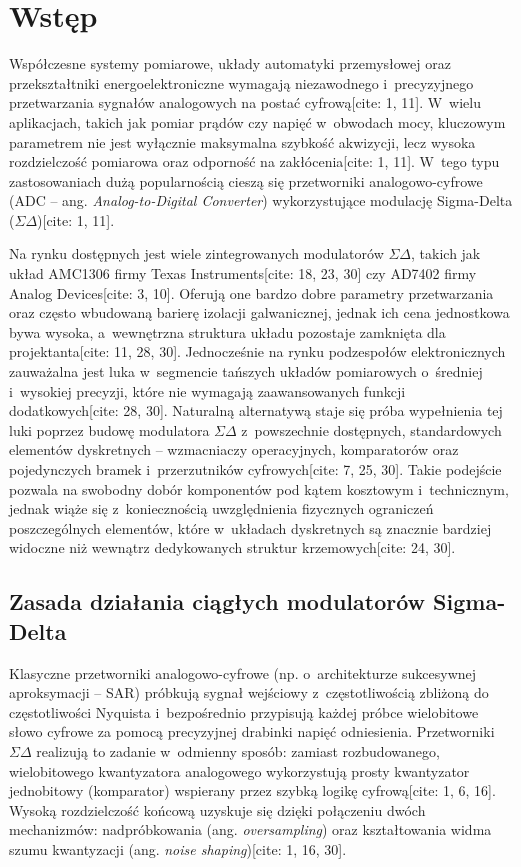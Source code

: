 \chapter{Wstęp}
\label{ch:wstep}

Współczesne systemy pomiarowe, układy automatyki przemysłowej oraz przekształtniki energoelektroniczne wymagają niezawodnego i~precyzyjnego przetwarzania sygnałów analogowych na postać cyfrową[cite: 1, 11]. W~wielu aplikacjach, takich jak pomiar prądów czy napięć w~obwodach mocy, kluczowym parametrem nie jest wyłącznie maksymalna szybkość akwizycji, lecz wysoka rozdzielczość pomiarowa oraz odporność na zakłócenia[cite: 1, 11]. W~tego typu zastosowaniach dużą popularnością cieszą się przetworniki analogowo-cyfrowe (ADC -- ang. \textit{Analog-to-Digital Converter}) wykorzystujące modulację Sigma-Delta ($\Sigma\Delta$)[cite: 1, 11].

Na rynku dostępnych jest wiele zintegrowanych modulatorów $\Sigma\Delta$, takich jak układ AMC1306 firmy Texas Instruments[cite: 18, 23, 30] czy AD7402 firmy Analog Devices[cite: 3, 10]. Oferują one bardzo dobre parametry przetwarzania oraz często wbudowaną barierę izolacji galwanicznej, jednak ich cena jednostkowa bywa wysoka, a~wewnętrzna struktura układu pozostaje zamknięta dla projektanta[cite: 11, 28, 30]. Jednocześnie na rynku podzespołów elektronicznych zauważalna jest luka w~segmencie tańszych układów pomiarowych o~średniej i~wysokiej precyzji, które nie wymagają zaawansowanych funkcji dodatkowych[cite: 28, 30]. Naturalną alternatywą staje się próba wypełnienia tej luki poprzez budowę modulatora $\Sigma\Delta$ z~powszechnie dostępnych, standardowych elementów dyskretnych -- wzmacniaczy operacyjnych, komparatorów oraz pojedynczych bramek i~przerzutników cyfrowych[cite: 7, 25, 30]. Takie podejście pozwala na swobodny dobór komponentów pod kątem kosztowym i~technicznym, jednak wiąże się z~koniecznością uwzględnienia fizycznych ograniczeń poszczególnych elementów, które w~układach dyskretnych są znacznie bardziej widoczne niż wewnątrz dedykowanych struktur krzemowych[cite: 24, 30].

\section{Zasada działania ciągłych modulatorów Sigma-Delta}
\label{sec:zasada_dzialania}

Klasyczne przetworniki analogowo-cyfrowe (np. o~architekturze sukcesywnej aproksymacji -- SAR) próbkują sygnał wejściowy z~częstotliwością zbliżoną do częstotliwości Nyquista i~bezpośrednio przypisują każdej próbce wielobitowe słowo cyfrowe za pomocą precyzyjnej drabinki napięć odniesienia. Przetworniki $\Sigma\Delta$ realizują to zadanie w~odmienny sposób: zamiast rozbudowanego, wielobitowego kwantyzatora analogowego wykorzystują prosty kwantyzator jednobitowy (komparator) wspierany przez szybką logikę cyfrową[cite: 1, 6, 16]. Wysoką rozdzielczość końcową uzyskuje się dzięki połączeniu dwóch mechanizmów: nadpróbkowania (ang. \textit{oversampling}) oraz kształtowania widma szumu kwantyzacji (ang. \textit{noise shaping})[cite: 1, 16, 30].

